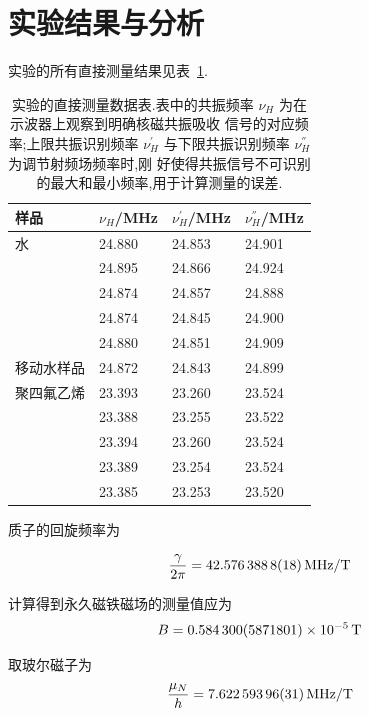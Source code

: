 \documentclass{buaaemp}
\begin{document}
\section{实验结果与分析}
实验的所有直接测量结果见表~\ref{tab:rawdata}.

\begin{table}[t]
\caption{
\label{tab:rawdata}%
实验的直接测量数据表.表中的共振频率 $\nu_H$ 为在示波器上观察到明确核磁共振吸收
信号的对应频率;上限共振识别频率 $\nu_H^'$ 与下限共振识别频率 
$\nu_H^{''}$ 为调节射频场频率时,刚
好使得共振信号不可识别的最大和最小频率,用于计算测量的误差.}

\begin{ruledtabular}
\begin{tabular}{llll}

样品 & $\nu_H$/MHz & $\nu_H^'$/MHz & $\nu_H^{''}$/MHz \\ \hline
水 & 24.880 & 24.853 & 24.901 \\
 &24.895&24.866&24.924\\
 &24.874 &24.857&24.888\\
 &24.874&24.845 &24.900\\
 &24.880 &24.851&24.909\\
移动水样品 &24.872 &24.843&24.899\\
 
聚四氟乙烯 & 23.393 & 23.260 & 23.524\\
&23.388&23.255&23.522\\
&23.394&23.260&23.524\\
&23.389&23.254&23.524\\
&23.385&23.253&23.520
\end{tabular}
\end{ruledtabular}

\end{table}

质子的回旋频率为\cite{qian}

\begin{equation}
\frac{\gamma}{2\pi} = \SI{42.5763888 \pm
  0.0000018}{MHz/T}
\end{equation}

计算得到永久磁铁磁场的测量值应为
\begin{equation}
B = \SI{0.5843 \pm 5.871801e-5}{T}
\end{equation}

取玻尔磁子为\cite{qian}
\begin{equation}
\frac{\mu_N}{h} = \SI{7.62259396 \pm 0.00000031}{MHz/T}
\end{equation}
\end{document}
